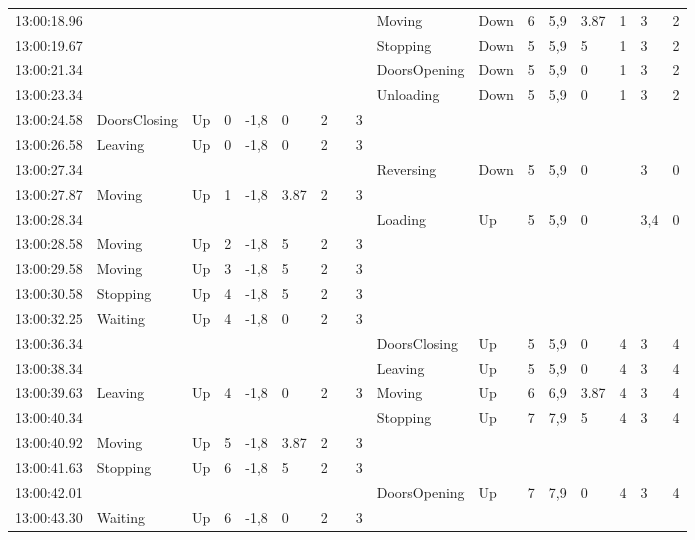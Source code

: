 \documentclass{UoYCSproject}
\begin{document}
\begin{appendices}
\begin{landscape}
\begin{longtable}{l || l | l | l | l | l | l | l | l || l | l | l | l | l | l | l | l}
	13:00:18.96 &  &  &  &  &  &  &  &  & Moving & Down & 6 & 5,9 & 3.87 & 1 & 3 & 2 \\
	13:00:19.67 &  &  &  &  &  &  &  &  & Stopping & Down & 5 & 5,9 & 5 & 1 & 3 & 2 \\
	13:00:21.34 &  &  &  &  &  &  &  &  & DoorsOpening & Down & 5 & 5,9 & 0 & 1 & 3 & 2 \\
	13:00:23.34 &  &  &  &  &  &  &  &  & Unloading & Down & 5 & 5,9 & 0 & 1 & 3 & 2 \\
	13:00:24.58 & DoorsClosing & Up & 0 & -1,8 & 0 & 2 &  & 3 &  &  &  &  &  &  &  &  \\
	13:00:26.58 & Leaving & Up & 0 & -1,8 & 0 & 2 &  & 3 &  &  &  &  &  &  &  &  \\
	13:00:27.34 &  &  &  &  &  &  &  &  & Reversing & Down & 5 & 5,9 & 0 &  & 3 & 0 \\
	13:00:27.87 & Moving & Up & 1 & -1,8 & 3.87 & 2 &  & 3 &  &  &  &  &  &  &  &  \\
	13:00:28.34 &  &  &  &  &  &  &  &  & Loading & Up & 5 & 5,9 & 0 &  & 3,4 & 0 \\
	13:00:28.58 & Moving & Up & 2 & -1,8 & 5 & 2 &  & 3 &  &  &  &  &  &  &  &  \\
	13:00:29.58 & Moving & Up & 3 & -1,8 & 5 & 2 &  & 3 &  &  &  &  &  &  &  &  \\
	13:00:30.58 & Stopping & Up & 4 & -1,8 & 5 & 2 &  & 3 &  &  &  &  &  &  &  &  \\
	13:00:32.25 & Waiting & Up & 4 & -1,8 & 0 & 2 &  & 3 &  &  &  &  &  &  &  &  \\
	13:00:36.34 &  &  &  &  &  &  &  &  & DoorsClosing & Up & 5 & 5,9 & 0 & 4 & 3 & 4 \\
	13:00:38.34 &  &  &  &  &  &  &  &  & Leaving & Up & 5 & 5,9 & 0 & 4 & 3 & 4 \\
	13:00:39.63 & Leaving & Up & 4 & -1,8 & 0 & 2 &  & 3 & Moving & Up & 6 & 6,9 & 3.87 & 4 & 3 & 4 \\
	13:00:40.34 &  &  &  &  &  &  &  &  & Stopping & Up & 7 & 7,9 & 5 & 4 & 3 & 4 \\
	13:00:40.92 & Moving & Up & 5 & -1,8 & 3.87 & 2 &  & 3 &  &  &  &  &  &  &  &  \\
	13:00:41.63 & Stopping & Up & 6 & -1,8 & 5 & 2 &  & 3 &  &  &  &  &  &  &  &  \\
	13:00:42.01 &  &  &  &  &  &  &  &  & DoorsOpening & Up & 7 & 7,9 & 0 & 4 & 3 & 4 \\
	13:00:43.30 & Waiting & Up & 6 & -1,8 & 0 & 2 &  & 3 &  &  &  &  &  &  &  &  \\

\end{longtable}
\end{landscape}
\end{appendices}
\end{document}
